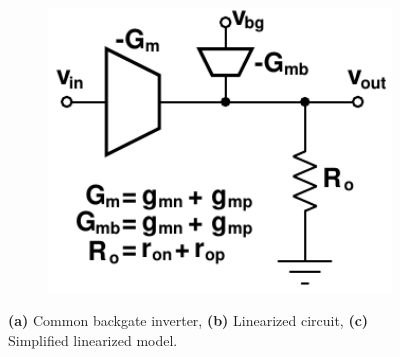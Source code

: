 \begin{figure}[htb!]
\begin{subfigure}{0.33\textwidth}
			        \caption{ }
			        \label{fig:fig_10b}
			    \end{subfigure}
			    \begin{subfigure}{0.33\textwidth}
			        \centering
			        \includegraphics[width=1\textwidth, angle=0]{./figs/design/fig_10c}
			        \caption{ }
			        \label{fig:fig_10c}
			    \end{subfigure}
			    \caption{\textbf{(a)} Common backgate inverter, \textbf{(b)} Linearized circuit, \textbf{(c)} Simplified linearized model.}
			    \label{fig:bg_inv_model}
			\end{figure} 

